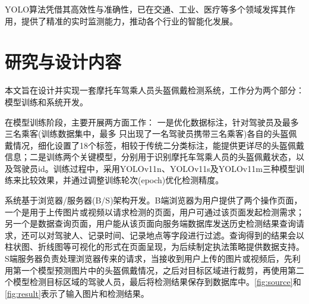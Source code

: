 YOLO算法凭借其高效性与准确性，已在交通、工业、医疗等多个领域发挥其作用，提供了精准的实时监测能力，推动各个行业的智能化发展。

\section{研究与设计内容}
本文旨在设计并实现一套摩托车驾乘人员头盔佩戴检测系统，工作分为两个部分：模型训练和系统开发。

在模型训练阶段，主要开展两方面工作：
一是优化数据标注，针对驾驶员及最多三名乘客(训练数据集中，最多 只出现了一名驾驶员携带三名乘客)各自的头盔佩戴情况，细化设置了18个标签，相较于传统二分类标注，能提供更详尽的头盔佩戴信息；二是训练两个关键模型，分别用于识别摩托车驾乘人员的头盔佩戴状态，以及驾驶员id。训练过程中，采用YOLOv11n、YOLOv11s及YOLOv11m三种模型训练来比较效果，并通过调整训练轮次(epoch)优化检测精度。

系统基于浏览器/服务器(B/S)架构开发。B端浏览器为用户提供了两个操作页面，一个是用于上传图片或视频以请求检测的页面，用户可通过该页面发起检测需求；另一个是数据查询页面，用户能从该页面向服务端数据库发送历史检测结果查询请求，还可以对驾驶人、记录时间、记录地点等字段进行过滤。查询得到的结果会以柱状图、折线图等可视化的形式在页面呈现，为后续制定执法策略提供数据支持。S端服务器负责处理浏览器传来的请求，当接收到用户上传的图片或视频后，先利用第一个模型预测图片中的头盔佩戴情况，之后对目标区域进行裁剪，再使用第二个模型检测目标区域的驾驶人员，最后将检测结果保存到数据库中。\ref{fig:source}和\ref{fig:result}表示了输入图片和检测结果。

